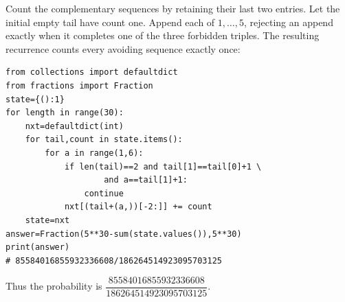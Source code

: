 Count the complementary sequences by retaining their last two entries. Let the initial empty tail have count one. Append each of $1,\ldots,5$, rejecting an append exactly when it completes one of the three forbidden triples. The resulting recurrence counts every avoiding sequence exactly once:
\begin{verbatim}
from collections import defaultdict
from fractions import Fraction
state={():1}
for length in range(30):
    nxt=defaultdict(int)
    for tail,count in state.items():
        for a in range(1,6):
            if len(tail)==2 and tail[1]==tail[0]+1 \
                    and a==tail[1]+1:
                continue
            nxt[(tail+(a,))[-2:]] += count
    state=nxt
answer=Fraction(5**30-sum(state.values()),5**30)
print(answer)
# 85584016855932336608/186264514923095703125
\end{verbatim}
Thus the probability is $\boxed{\dfrac{85584016855932336608}{186264514923095703125}}$.
